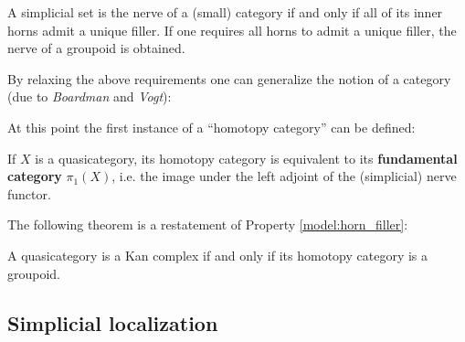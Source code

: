     \begin{property}\label{model:horn_filler}
        A simplicial set is the nerve of a (small) category if and only if all of its inner horns admit a unique filler. If one requires all horns to admit a unique filler, the nerve of a groupoid is obtained.
    \end{property}

    By relaxing the above requirements one can generalize the notion of a category (due to \textit{Boardman} and \textit{Vogt}):

    At this point the first instance of a ``homotopy category'' can be defined:
    \begin{property}
        If $X$ is a quasicategory, its homotopy category is equivalent to its \textbf{fundamental category} $\pi_1(X)$, i.e. the image under the left adjoint of the (simplicial) nerve functor.
    \end{property}

    The following theorem is a restatement of Property \ref{model:horn_filler}:
    \begin{theorem}[Joyal]
        A quasicategory is a Kan complex if and only if its homotopy category is a groupoid.
    \end{theorem}

\subsection{Simplicial localization}

